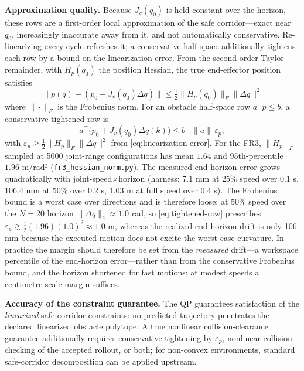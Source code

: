 \textbf{Approximation quality.} Because \(J_v(q_0)\) is held constant over
the horizon, these rows are a first-order local approximation of the safe
corridor---exact near \(q_0\), increasingly inaccurate away from it, and
not automatically conservative. Re-linearizing every cycle refreshes it; a
conservative half-space additionally tightens each row by a bound on the
linearization error. From the second-order Taylor remainder, with
\(H_p(q_0)\) the position Hessian, the true end-effector position
satisfies
\begin{equation}
\label{eq:linearization-error}
\|p(q) - (p_0 + J_v(q_0)\Delta q)\|
\leq \tfrac{1}{2} \|H_p(q_0)\|_F \|\Delta q\|^2
\end{equation}
where \(\|\cdot\|_F\) is the Frobenius norm. For an obstacle half-space
row \(a^\top p\le b\), a conservative tightened row is
\begin{equation}
\label{eq:tightened-row}
a^\top\bigl(p_0+J_v(q_0)\Delta q(k)\bigr)
\le b-\|a\|\,\varepsilon_p,
\end{equation}
with
\(\varepsilon_p \geq \tfrac{1}{2}\|H_p\|_{F}\|\Delta q\|^2\) from
\eqref{eq:linearization-error}. For the FR3, \(\|H_p\|_F\) sampled at 5000
joint-range configurations has mean \(1.64\) and 95th-percentile \(1.96\)
m/rad² (\texttt{fr3\_hessian\_norm.py}). The measured end-horizon error
grows quadratically with joint-speed$\times$horizon (harness: 7.1 mm at
25\% speed over 0.1 s, 106.4 mm at 50\% over 0.2 s, 1.03 m at full speed
over 0.4 s). The Frobenius bound is a worst case over directions and is
therefore loose: at 50\% speed over the \(N=20\) horizon
\(\|\Delta q\|_2\approx 1.0\) rad, so \eqref{eq:tightened-row} prescribes
\(\varepsilon_p \gtrsim \tfrac{1}{2}(1.96)(1.0)^2 \approx 1.0\) m, whereas
the realized end-horizon drift is only 106 mm because the executed motion
does not excite the worst-case curvature. In practice the margin should
therefore be set from the \emph{measured} drift---a workspace percentile of
the end-horizon error---rather than from the conservative Frobenius bound,
and the horizon shortened for fast motions; at modest speeds a
centimetre-scale margin suffices.

\textbf{Accuracy of the constraint guarantee.} The QP guarantees
satisfaction of the \emph{linearized} safe-corridor constraints: no
predicted trajectory penetrates the declared linearized obstacle polytope.
A true nonlinear collision-clearance guarantee additionally requires
conservative tightening by \(\varepsilon_p\), nonlinear collision checking
of the accepted rollout, or both; for non-convex environments, standard
safe-corridor decomposition \cite{safe_corridor} can be applied upstream.

